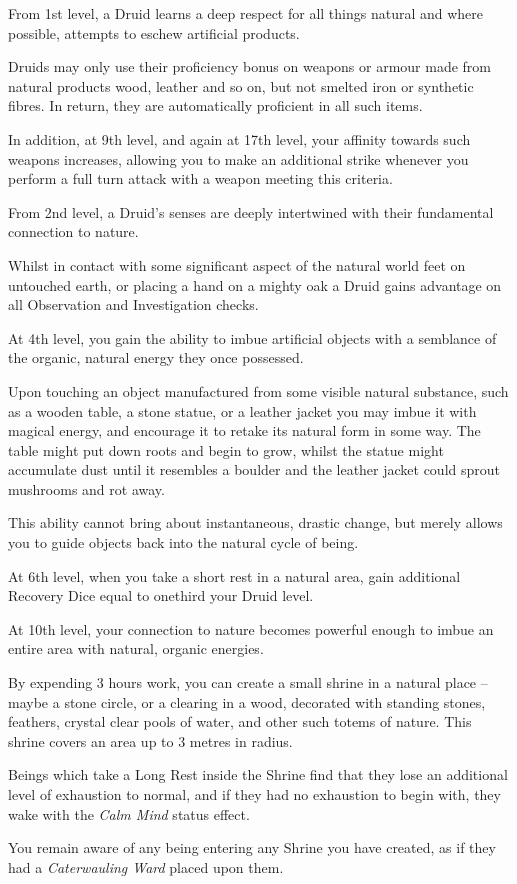 {
	From 1st level, a Druid learns a deep respect for all things natural \minus{} and where possible, attempts to eschew artificial products. 
	
	Druids may only use their proficiency bonus on weapons or armour made from natural products \minus{} wood, leather and so on, but not smelted iron or synthetic fibres. In return, they are automatically proficient in all such items. 
	
	In addition, at 9th level, and again at 17th level, your affinity towards such weapons increases, allowing you to make an additional strike whenever you perform a full turn attack with a weapon meeting this criteria.
}




{
From 2nd level, a Druid's senses are deeply intertwined with their fundamental connection to nature. 

Whilst in contact with some significant aspect of the natural world \minus{} feet on untouched earth, or placing a hand on a mighty oak \minus{} a Druid gains advantage on all Observation and Investigation checks. 
}

{
	At 4th level, you gain the ability to imbue artificial objects with a semblance of the organic, natural energy they once possessed. 
	
	Upon touching an object manufactured from some visible natural substance, such as a wooden table, a stone statue, or a leather jacket you may imbue it with magical energy, and encourage it to retake its natural form in some way. The table might put down roots and begin to grow, whilst the statue might accumulate dust until it resembles a boulder and the leather jacket could sprout mushrooms and rot away. 

	This ability cannot bring about instantaneous, drastic change, but merely allows you to guide objects back into the natural cycle of being. 
}

{
	At 6th level, when you take a short rest in a natural area, gain additional Recovery Dice equal to one\minus{}third your Druid level. 
}

{
	At 10th level, your connection to nature becomes powerful enough to imbue an entire area with natural, organic energies.
	
	By expending 3 hours work, you can create a small shrine in a natural place – maybe a stone circle, or a clearing in a wood, decorated with standing stones, feathers, crystal clear pools of water, and other such totems of nature. This shrine covers an area up to 3 metres in radius. 

	Beings which take a Long Rest inside the Shrine find that they lose an additional level of exhaustion to normal, and if they had no exhaustion to begin with, they wake with the {\it Calm Mind} status effect. 
	
	You remain aware of any being entering any Shrine you have created, as if they had a {\it Caterwauling Ward} placed upon them.
}

